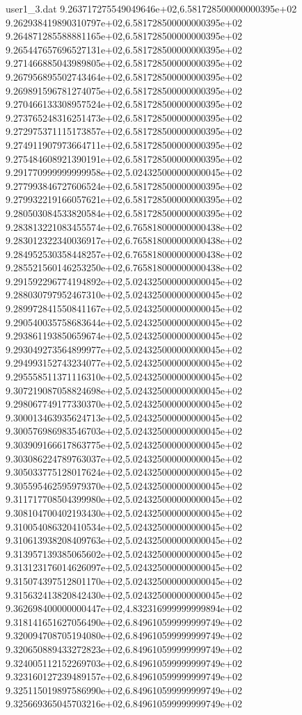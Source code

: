 \begin{filecontents}{user1_3.dat}
9.263717275549049646e+02,6.581728500000000395e+02
9.262938419890310797e+02,6.581728500000000395e+02
9.264871285588881165e+02,6.581728500000000395e+02
9.265447657696527131e+02,6.581728500000000395e+02
9.271466885043989805e+02,6.581728500000000395e+02
9.267956895502743464e+02,6.581728500000000395e+02
9.269891596781274075e+02,6.581728500000000395e+02
9.270466133308957524e+02,6.581728500000000395e+02
9.273765248316251473e+02,6.581728500000000395e+02
9.272975371115173857e+02,6.581728500000000395e+02
9.274911907973664711e+02,6.581728500000000395e+02
9.275484608921390191e+02,6.581728500000000395e+02
9.291770999999999958e+02,5.024325000000000045e+02
9.277993846727606524e+02,6.581728500000000395e+02
9.279932219166057621e+02,6.581728500000000395e+02
9.280503084533820584e+02,6.581728500000000395e+02
9.283813221083455574e+02,6.765818000000000438e+02
9.283012322340036917e+02,6.765818000000000438e+02
9.284952530358448257e+02,6.765818000000000438e+02
9.285521560146253250e+02,6.765818000000000438e+02
9.291592296774194892e+02,5.024325000000000045e+02
9.288030797952467310e+02,5.024325000000000045e+02
9.289972841550841167e+02,5.024325000000000045e+02
9.290540035758683644e+02,5.024325000000000045e+02
9.293861193850659674e+02,5.024325000000000045e+02
9.293049273564899977e+02,5.024325000000000045e+02
9.294993152743234077e+02,5.024325000000000045e+02
9.295558511371116310e+02,5.024325000000000045e+02
9.307219087058824698e+02,5.024325000000000045e+02
9.298067749177330370e+02,5.024325000000000045e+02
9.300013463935624713e+02,5.024325000000000045e+02
9.300576986983546703e+02,5.024325000000000045e+02
9.303909166617863775e+02,5.024325000000000045e+02
9.303086224789763037e+02,5.024325000000000045e+02
9.305033775128017624e+02,5.024325000000000045e+02
9.305595462595979370e+02,5.024325000000000045e+02
9.311717708504399980e+02,5.024325000000000045e+02
9.308104700402193430e+02,5.024325000000000045e+02
9.310054086320410534e+02,5.024325000000000045e+02
9.310613938208409763e+02,5.024325000000000045e+02
9.313957139385065602e+02,5.024325000000000045e+02
9.313123176014626097e+02,5.024325000000000045e+02
9.315074397512801170e+02,5.024325000000000045e+02
9.315632413820842430e+02,5.024325000000000045e+02
9.362698400000000447e+02,4.832316999999999894e+02
9.318141651627056490e+02,6.849610599999999749e+02
9.320094708705194080e+02,6.849610599999999749e+02
9.320650889433272823e+02,6.849610599999999749e+02
9.324005112152269703e+02,6.849610599999999749e+02
9.323160127239489157e+02,6.849610599999999749e+02
9.325115019897586990e+02,6.849610599999999749e+02
9.325669365045703216e+02,6.849610599999999749e+02

\end{filecontents}
